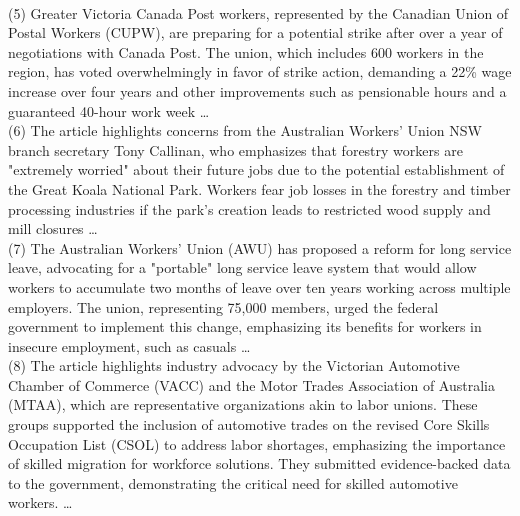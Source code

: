 \begin{ReasoningBox}[title=Temporal Relation Reasoning]
    \\
    (5) Greater Victoria Canada Post workers, represented by the Canadian Union of Postal Workers (CUPW), are preparing for a potential strike after over a year of negotiations with Canada Post. The union, which includes 600 workers in the region, has voted overwhelmingly in favor of strike action, demanding a 22\% wage increase over four years and other improvements such as pensionable hours and a guaranteed 40-hour work week \ldots
    \\
    (6) The article highlights concerns from the Australian Workers' Union NSW branch secretary Tony Callinan, who emphasizes that forestry workers are "extremely worried" about their future jobs due to the potential establishment of the Great Koala National Park. Workers fear job losses in the forestry and timber processing industries if the park's creation leads to restricted wood supply and mill closures \ldots
    \\
    (7) The Australian Workers' Union (AWU) has proposed a reform for long service leave, advocating for a "portable" long service leave system that would allow workers to accumulate two months of leave over ten years working across multiple employers. The union, representing 75,000 members, urged the federal government to implement this change, emphasizing its benefits for workers in insecure employment, such as casuals \ldots
    \\
    (8) The article highlights industry advocacy by the Victorian Automotive Chamber of Commerce (VACC) and the Motor Trades Association of Australia (MTAA), which are representative organizations akin to labor unions. These groups supported the inclusion of automotive trades on the revised Core Skills Occupation List (CSOL) to address labor shortages, emphasizing the importance of skilled migration for workforce solutions. They submitted evidence-backed data to the government, demonstrating the critical need for skilled automotive workers. \ldots


\end{ReasoningBox}
